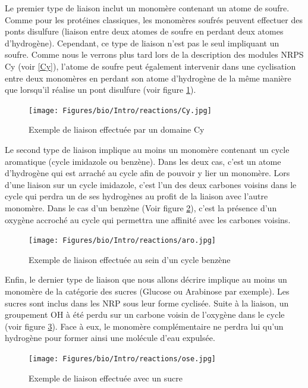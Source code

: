Le premier type de liaison inclut un monomère contenant un atome de soufre.
Comme pour les protéines classiques, les monomères soufrés peuvent effectuer des ponts disulfure (liaison entre deux atomes de soufre en perdant deux atomes d'hydrogène).
Cependant, ce type de liaison n'est pas le seul impliquant un soufre.
Comme nous le verrons plus tard lors de la description des modules NRPS Cy (voir \ref{Cy}), l'atome de soufre peut également intervenir dans une cyclisation entre deux monomères en perdant son atome d'hydrogène de la même manière que lorsqu'il réalise un pont disulfure (voir figure \ref{Cy_link}).

\begin{figure}[h!]
  \begin{center}
    \texttt{[image: Figures/bio/Intro/reactions/Cy.jpg]}
    \caption{\label{Cy_link}Exemple de liaison effectuée par un domaine Cy}
  \end{center}
\end{figure}

Le second type de liaison implique au moins un monomère contenant un cycle aromatique (cycle imidazole ou benzène).
Dans les deux cas, c'est un atome d'hydrogène qui est arraché au cycle afin de pouvoir y lier un monomère.
Lors d'une liaison sur un cycle imidazole, c'est l'un des deux carbones voisins dans le cycle qui perdra un de ses hydrogènes au profit de la liaison avec l'autre monomère.
Dans le cas d'un benzène (Voir figure \ref{benzene}), c'est la présence d'un oxygène accroché au cycle qui permettra une affinité avec les carbones voisins.

\begin{figure}[h!]
  \begin{center}
    \texttt{[image: Figures/bio/Intro/reactions/aro.jpg]}
    \caption{\label{benzene}Exemple de liaison effectuée au sein d'un cycle benzène}
  \end{center}
\end{figure}

Enfin, le dernier type de liaison que nous allons décrire implique au moins un monomère de la catégorie des sucres (Glucose ou Arabinose par exemple).
Les sucres sont inclus dans les NRP sous leur forme cyclisée.
Suite à la liaison, un groupement OH à été perdu sur un carbone voisin de l'oxygène dans le cycle (voir figure \ref{ose}).
Face à eux, le monomère complémentaire ne perdra lui qu'un hydrogène pour former ainsi une molécule d'eau expulsée.

\begin{figure}[h!]
  \begin{center}
    \texttt{[image: Figures/bio/Intro/reactions/ose.jpg]}
    \caption{\label{ose}Exemple de liaison effectuée avec un sucre}
  \end{center}
\end{figure}

